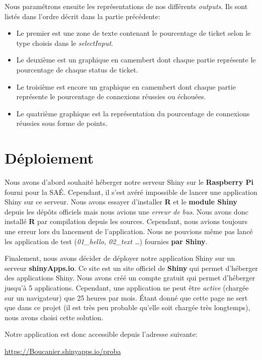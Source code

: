 \documentclass[12pt, a4paper]{article}
\begin{document}
\noindent Nous paramétrons ensuite les représentations de nos différents \textit{outputs}.
Ils sont listés dans l'ordre décrit dans la partie précédente:

\begin{itemize}
    \item Le premier est une zone de texte contenant le pourcentage de ticket selon le type choisis dans le \textit{selectInput}.
    \item Le deuxième est un graphique en camembert dont chaque partie représente le pourcentage de chaque status de ticket.
    \item Le troisième est encore un graphique en camembert dont chaque partie représente le pourcentage de connexions réussies ou échouées.
    \item Le quatrième graphique est la représentation du pourcentage de connexions réussies sous forme de points.
\end{itemize}

\section{Déploiement}

Nous avons d'abord souhaité héberger notre serveur Shiny sur le \textbf{Raspberry Pi} fourni pour la SAÉ.
Cependant, il s'est avéré impossible de lancer une application Shiny sur ce serveur.
Nous avons essayer d'installer \textbf{R} et le \textbf{module Shiny} depuis les dépôts officiels mais nous avions une \textit{erreur de bus}.
Nous avons donc installé \textbf{R} par compilation depuis les sources.
Cependant, nous avions toujours une erreur lors du lancement de l'application.
Nous ne pouvions même pas lancé les application de test (\textit{01\_hello, 02\_text \ldots}) fournies \textbf{par Shiny}.
\bigskip

Finalement, nous avons décider de déployer notre application Shiny sur un serveur \textbf{shinyApps.io}.
Ce site est un site officiel de \textbf{Shiny} qui permet d'héberger des applications Shiny.
Nous avons créé un compte gratuit qui permet d'héberger jusqu'à 5 applications.
Cependant, une application ne peut être \textit{active} (chargée sur un navigateur) que 25 heures par mois.
Étant donné que cette page ne sert que dans ce projet (il est très peu probable qu'elle soit chargée très longtemps),
nous avons choisi cette solution.
\bigskip

\noindent Notre application est donc accessible depuis l'adresse suivante:
\begin{center}
    \url{https://Boucanier.shinyapps.io/proba}
\end{center}
\end{document}
